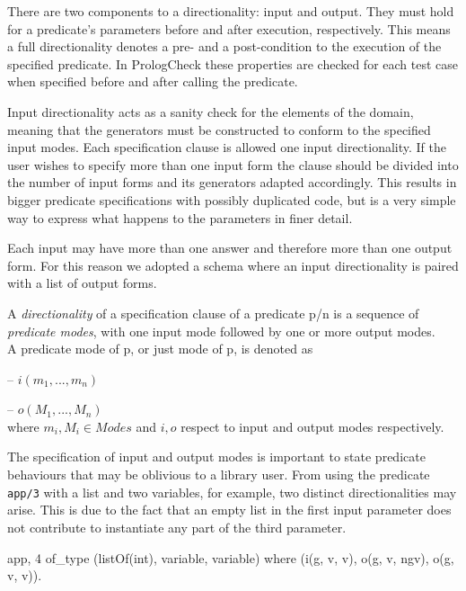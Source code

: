 \documentclass[runningheads,a4paper]{llncs}
\newcommand{\yap}[1]{\lstinline[style=yap]{#1}}
\newcommand{\plqc}[0]{{\sf PrologCheck}}
\begin{document}
There are two components to a directionality: input and output.
%
They must hold for a predicate's parameters before and after execution,
respectively.
%
This means a full directionality denotes a pre- and a post-condition to
the execution of the specified predicate.
%
In \plqc{} these properties are checked for each test case when
specified before and after calling the predicate.


Input directionality acts as a sanity check for the elements of the
domain, meaning that the generators must be constructed to conform to the
specified input modes.
%
Each specification clause is allowed one input directionality.
%
If the user wishes to specify more than one input form the clause should
be divided into the number of input forms and its generators adapted
accordingly.
%
This results in bigger predicate specifications with possibly
duplicated code, but is a very simple way to express what happens to the
parameters in finer detail.


Each input may have more than one answer and therefore more than one
output form.
%
For this reason we adopted a schema where an input directionality is
paired with a list of output forms.


\begin{definition}
\label{def:directionality}
A \emph{directionality} of a specification clause of a predicate
p/n is a sequence of \emph{predicate modes}, with one input mode
followed by one or more output modes.
\\
A predicate mode of p, or just mode of p, is denoted as

\;\;  -- $i(m_1, ..., m_n)$

\;\;  -- $o(M_1, ..., M_n)$
\\
where $m_i,M_i \in Modes$ and $i, o$ respect to input and output modes
respectively.
\end{definition}


The specification of input and output modes is important to state
predicate behaviours that may be oblivious to a library user.
%
From using the predicate \yap{app/3} with a list and two variables, for
example, two distinct directionalities may arise.
%
This is due to the fact that an empty list in the first input parameter does
not contribute to instantiate any part of the third parameter.
%
\begin{yapcode}
 {app, 4} of_type (listOf(int), variable, variable)
    where (i(g, v, v), o(g, v, ngv), o(g, v, v)).
\end{yapcode}
\end{document}
